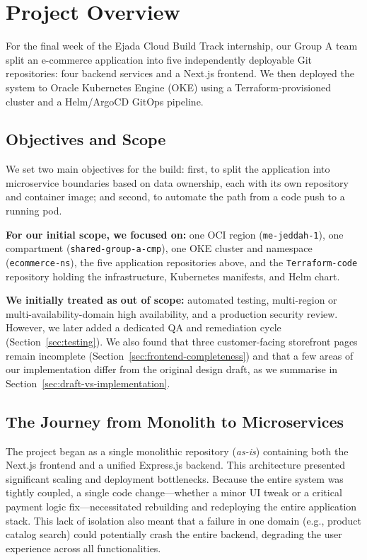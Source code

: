 \chapter{Project Overview}\label{chap:intro}

For the final week of the Ejada Cloud Build Track internship, our Group A team
split an e-commerce application into five independently deployable Git
repositories: four backend services and a Next.js frontend. We then deployed the
system to Oracle Kubernetes Engine (OKE) using a Terraform-provisioned cluster
and a Helm/ArgoCD GitOps pipeline.

\section{Objectives and Scope}\label{sec:core-question}
We set two main objectives for the build: first, to split the application into
microservice boundaries based on data ownership, each with its own repository and
container image; and second, to automate the path from a code push to a running
pod.

\textbf{For our initial scope, we focused on:} one OCI region (\texttt{me-jeddah-1}), one compartment
(\texttt{shared-group-a-cmp}), one OKE cluster and namespace
(\texttt{ecommerce-ns}), the five application repositories above, and the
\texttt{Terraform-code} repository holding the infrastructure, Kubernetes manifests,
and Helm chart.

\textbf{We initially treated as out of scope:} automated testing, multi-region or
multi-availability-domain high availability, and a production security review.
However, we later added a dedicated QA and remediation cycle
(Section~\ref{sec:testing}). We also found that three customer-facing storefront
pages remain incomplete (Section~\ref{sec:frontend-completeness}) and that a few
areas of our implementation differ from the original design draft, as we
summarise in Section~\ref{sec:draft-vs-implementation}.

\section{The Journey from Monolith to Microservices}\label{sec:monolith-journey}
The project began as a single monolithic repository (\textit{as-is}) containing both the Next.js frontend and a unified Express.js backend. This architecture presented significant scaling and deployment bottlenecks. Because the entire system was tightly coupled, a single code change—whether a minor UI tweak or a critical payment logic fix—necessitated rebuilding and redeploying the entire application stack. This lack of isolation also meant that a failure in one domain (e.g., product catalog search) could potentially crash the entire backend, degrading the user experience across all functionalities.

